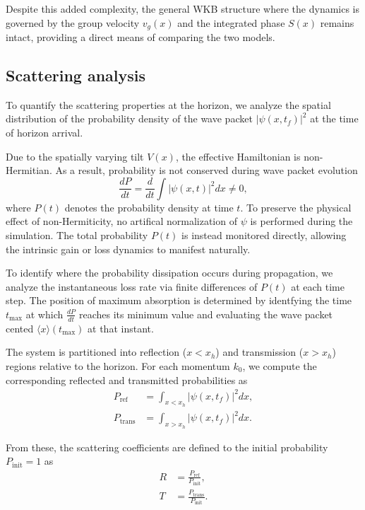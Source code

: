 \documentclass[%
 aip,
 amsmath,amssymb,
 reprint,%
]{revtex4-1}
\begin{document}
Despite this added complexity, the general WKB structure where the dynamics is governed by the group velocity $v_g(x)$ and the integrated phase $S(x)$ remains intact, providing a direct means of comparing the two models.

\subsection{Scattering analysis}

To quantify the scattering properties at the horizon, we analyze the spatial distribution of the probability density of the wave packet $|\psi(x,t_f)|^2$ at the time of horizon arrival.

Due to the spatially varying tilt $V(x)$, the effective Hamiltonian is non-Hermitian. As a result, probability is not conserved during wave packet evolution
\begin{equation}
    \frac{dP}{dt} = \frac{d}{dt} \int |\psi(x,t)|^2 dx \neq 0,
\end{equation}
where $P(t)$ denotes the probability density at time $t$. To preserve the physical effect of non-Hermiticity, no artifical normalization of $\psi$ is performed during the simulation. The total probability $P(t)$ is instead monitored directly, allowing the intrinsic gain or loss dynamics to manifest naturally.

To identify where the probability dissipation occurs during propagation, we analyze the instantaneous loss rate via finite differences of $P(t)$ at each time step. The position of maximum absorption is determined by identfying the time $t_{\text{max}}$ at which $\frac{dP}{dt}$ reaches its minimum value and evaluating the wave packet cented $\langle x \rangle(t_{\text{max}})$ at that instant.

The system is partitioned into reflection ($x<x_h$) and transmission ($x>x_h$) regions relative to the horizon. For each momentum $k_0$, we compute the corresponding reflected and transmitted probabilities as
\begin{align}
    P_{\text{ref}} &= \int_{x<x_h} |\psi(x,t_f)|^2 dx, \\
    P_{\text{trans}} &= \int_{x>x_h} |\psi(x,t_f)|^2 dx.
\end{align}

From these, the scattering coefficients are defined to the initial probability $P_{\text{init}}=1$ as
\begin{align}
    R &= \frac{P_{\text{ref}}}{P_{\text{init}}}, \\
    T &= \frac{P_{\text{trans}}}{P_{\text{init}}}.
\end{align}
\end{document}
